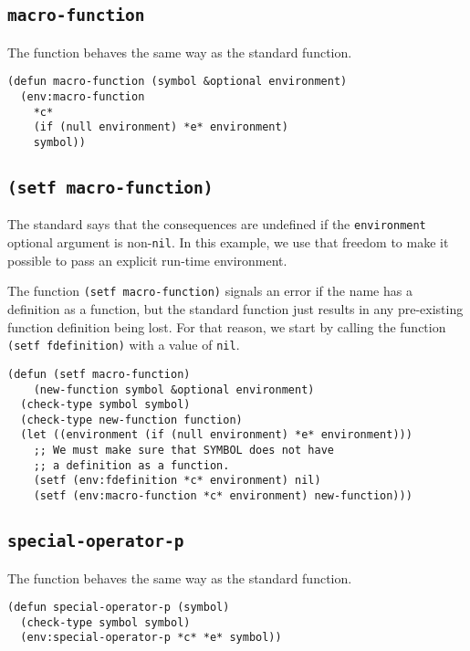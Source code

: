 \subsection{\texttt{macro-function}}

The \sysname{} function behaves the same way as the standard function.

\begin{verbatim}
(defun macro-function (symbol &optional environment)
  (env:macro-function
    *c*
    (if (null environment) *e* environment)
    symbol))
\end{verbatim}

\subsection{\texttt{(setf macro-function)}}

The standard says that the consequences are undefined if the
\texttt{environment} optional argument is non-\texttt{nil}.  In this
example, we use that freedom to make it possible to pass an explicit
run-time environment.

The \sysname{} function \texttt{(setf macro-function)} signals an
error if the name has a definition as a function, but the standard
function just results in any pre-existing function definition being
lost.  For that reason, we start by calling the \sysname{} function
\texttt{(setf fdefinition)} with a value of \texttt{nil}.

\begin{verbatim}
(defun (setf macro-function)
    (new-function symbol &optional environment)
  (check-type symbol symbol)
  (check-type new-function function)
  (let ((environment (if (null environment) *e* environment)))
    ;; We must make sure that SYMBOL does not have
    ;; a definition as a function.
    (setf (env:fdefinition *c* environment) nil)
    (setf (env:macro-function *c* environment) new-function)))
\end{verbatim}

\subsection{\texttt{special-operator-p}}

The \sysname{} function behaves the same way as the standard function.

\begin{verbatim}
(defun special-operator-p (symbol)
  (check-type symbol symbol)
  (env:special-operator-p *c* *e* symbol))
\end{verbatim}

